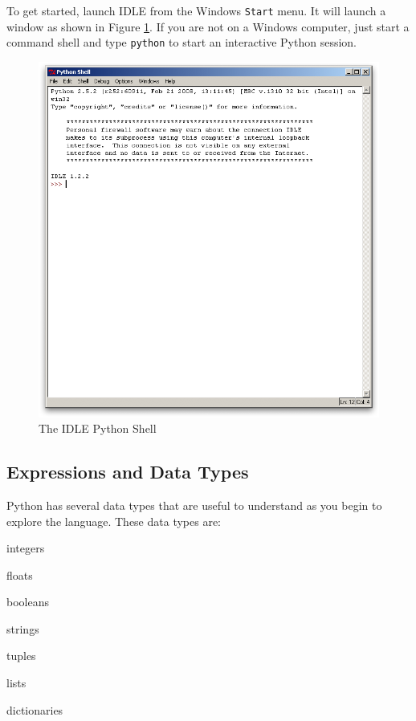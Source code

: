 To get started, launch IDLE from the Windows \verb#Start# menu.  It will launch a window as shown in Figure \ref{fig:python-idle}.  If you are not on a Windows computer, just start a command shell and type \verb#python# to start an interactive Python session.

\begin{figure}[htp]
\begin{center}
\includegraphics[scale=0.4]{graphics/python-idle.png}
\end{center}
\caption{The IDLE Python Shell}
\label{fig:python-idle}
\end{figure}

\subsection{Expressions and Data Types}

Python has several data types that are useful to understand as you begin to explore the language.  These data types are:

\squishlist
\item integers
\item floats
\item booleans
\item strings
\item tuples
\item lists
\item dictionaries
\squishend

